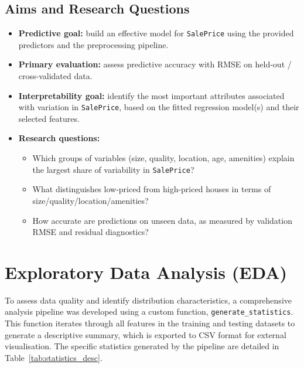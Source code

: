 \documentclass[12pt,oneside]{article} %
\begin{document}
\subsection{Aims and Research Questions}
\begin{itemize}
    \item \textbf{Predictive goal:} build an effective model for \texttt{SalePrice} using the provided predictors and the preprocessing pipeline.

    \item \textbf{Primary evaluation:} assess predictive accuracy with RMSE on held-out / cross-validated data.

    \item \textbf{Interpretability goal:} identify the most important attributes associated with variation in \texttt{SalePrice}, based on the fitted regression model(s) and their selected features.
    
    \item \textbf{Research questions:}
    \begin{itemize}
        \item Which groups of variables (size, quality, location, age, amenities) explain the largest share of variability in \texttt{SalePrice}?
        \item What distinguishes low-priced from high-priced houses in terms of size/quality/location/amenities?
        \item How accurate are predictions on unseen data, as measured by validation RMSE and residual diagnostics?
    \end{itemize}
\end{itemize}


\section{Exploratory Data Analysis (EDA)}

To assess data quality and identify distribution characteristics, a comprehensive analysis pipeline was developed using a custom function, \texttt{generate\_statistics}. This function iterates through all features in the training and testing datasets to generate a descriptive summary, which is exported to CSV format for external visualisation. The specific statistics generated by the pipeline are detailed in Table~\ref{tab:statistics_desc}.
\end{document}
